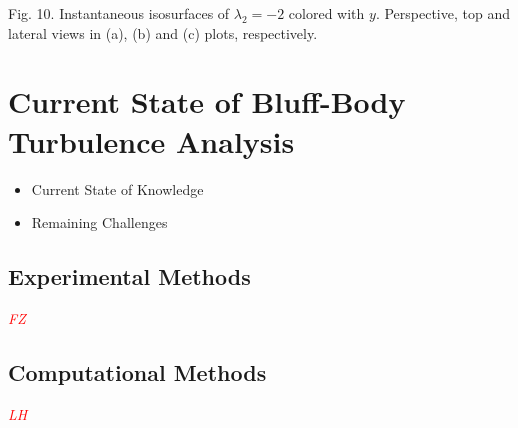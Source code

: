 \documentclass[journal]{new-aiaa}
\begin{document}
Fig. 10. Instantaneous isosurfaces of $\lambda_2=-2$ colored with $y$. Perspective, top and lateral views in (a), (b) and (c) plots, respectively.































\section{Current State of Bluff-Body Turbulence Analysis} \label{sec:currentstate}

\begin{itemize}
    \item Current State of Knowledge
    \item Remaining Challenges
\end{itemize}


\subsection{Experimental Methods} \label{subsec:currentstateexperimental}

\textcolor{red}{\emph{FZ}}


\subsection{Computational Methods} \label{subsec:currentstatecomputational}



\textcolor{red}{\emph{LH}}
\end{document}
